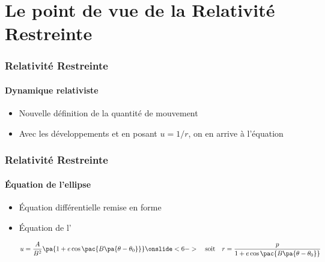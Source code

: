 \section{Le point de vue de la Relativité Restreinte}

\begin{frame}
\frametitle{Relativité Restreinte}
\framesubtitle{Dynamique relativiste}

\begin{itemize}
	\item	<1->	Nouvelle définition de la quantité de mouvement
	
	
	\item	<3->	Avec les développements  et en posant 
	$u=1/r$, on en arrive à l'équation
	
	
	
\end{itemize}

\end{frame}


\begin{frame}
\frametitle{Relativité Restreinte}
\framesubtitle{Équation de l'ellipse}

\begin{itemize}
	\item	<1->	Équation différentielle remise en forme
	
	
	\item	<4->	Équation de l'
	
	$$
	u = \frac{A}{B^2} \pa{1 + e\cos{\pac{B\pa{\theta - \theta_0}}}}
	\onslide <6->
	\quad\text{soit}\quad
	r = \frac{p}{1+e\cos{\pac{B\pa{\theta - \theta_0}}}}
	$$
	
\end{itemize}

\end{frame}

